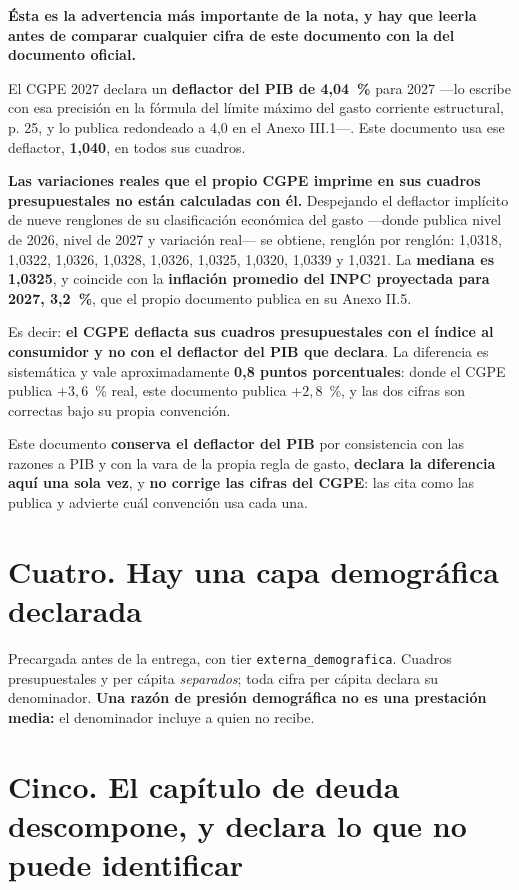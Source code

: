 \textbf{Ésta es la advertencia más importante de la nota, y hay que leerla antes de comparar
cualquier cifra de este documento con la del documento oficial.}

El CGPE 2027 declara un \textbf{deflactor del PIB de 4,04~\%} para 2027 ---lo escribe con
esa precisión en la fórmula del límite máximo del gasto corriente estructural, p. 25, y lo
publica redondeado a 4,0 en el Anexo III.1---. Este documento usa ese deflactor,
\textbf{1,040}, en todos sus cuadros.

\textbf{Las variaciones reales que el propio CGPE imprime en sus cuadros presupuestales no
están calculadas con él.} Despejando el deflactor implícito de nueve renglones de su
clasificación económica del gasto ---donde publica nivel de 2026, nivel de 2027 y variación
real--- se obtiene, renglón por renglón: 1,0318, 1,0322, 1,0326, 1,0328, 1,0326, 1,0325,
1,0320, 1,0339 y 1,0321. La \textbf{mediana es 1,0325}, y coincide con la
\textbf{inflación promedio del INPC proyectada para 2027, 3,2~\%}, que el propio documento
publica en su Anexo II.5.

Es decir: \textbf{el CGPE deflacta sus cuadros presupuestales con el índice al consumidor y
no con el deflactor del PIB que declara}. La diferencia es sistemática y vale
aproximadamente \textbf{0,8 puntos porcentuales}: donde el CGPE publica $+3,6$~\% real,
este documento publica $+2,8$~\%, y las dos cifras son correctas bajo su propia convención.

Este documento \textbf{conserva el deflactor del PIB} por consistencia con las razones a PIB
y con la vara de la propia regla de gasto, \textbf{declara la diferencia aquí una sola vez},
y \textbf{no corrige las cifras del CGPE}: las cita como las publica y advierte cuál
convención usa cada una.

\section*{Cuatro. Hay una capa demográfica declarada}

Precargada antes de la entrega, con tier \texttt{externa\_demografica}. Cuadros presupuestales
y per cápita \emph{separados}; toda cifra per cápita declara su denominador. \textbf{Una razón
de presión demográfica no es una prestación media:} el denominador incluye a quien no recibe.

\section*{Cinco. El capítulo de deuda descompone, y declara lo que no puede identificar}
